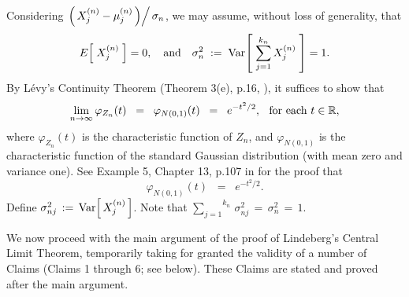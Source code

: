 \proof
Considering $\left.\left(\,X^{(n)}_{j} - \mu^{(n)}_{j}\,\right) \right/ \sigma_{n}$, we may assume, without loss of generality, that
\begin{equation*}
E\!\left[\;X^{(n)}_{j}\;\right] = 0,
\quad\textnormal{and}\quad
\sigma^{2}_{n}\;:=\;\Var\!\left[\;\sum^{k_{n}}_{j=1}X^{(n)}_{j}\;\right] = 1.
\end{equation*}
By L\'evy's Continuity Theorem (Theorem 3(e), p.16, \cite{Ferguson1996}), it suffices to show that
\begin{equation*}
\lim_{n\rightarrow\infty}\varphi_{Z_{n}}(t)
\;\;=\;\; \varphi_{N(0,1)}(t)
\;\;=\;\; e^{-t^{2}/2},
\;\;\,
\textnormal{for each $t \in \Re$},
\end{equation*}
where $\varphi_{Z_{n}}(t)$ is the characteristic function of $Z_{n}$, and 
$\varphi_{N(0,1)}$ is the characteristic function of the standard Gaussian distribution (with mean zero and variance one).
See Example 5, Chapter 13, p.107 in \cite{JacodProtter} for the proof that
\begin{equation*}
\varphi_{N(0,1)}(t) \;\;=\;\; e^{-t^{2}/2}.
\end{equation*} 
Define $\sigma^{2}_{nj} \,:=\, \Var\!\left[\,X^{(n)}_{j}\,\right]$.
Note that $\overset{k_{n}}{\underset{j=1}{\sum}}\,\sigma^{2}_{nj} \,=\, \sigma^{2}_{n} \,=\,1$.

\vskip 0.5cm
\noindent
We now proceed with the main argument of the proof of Lindeberg's Central Limit Theorem,
temporarily taking for granted the validity of a number of Claims (Claims 1 through 6; see below).
These Claims are stated and proved after the main argument.

